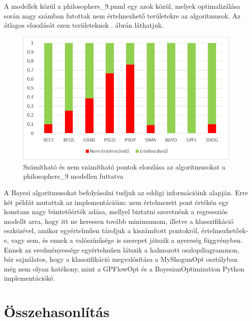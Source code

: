 A modellek közül a philosophers\_9.pnml egy azok közül, melyek optimalizálása során nagy számban futottak nem értelmezhető területekre az algoritmusok. Az átlagos eloszlását ezen területeknek . ábrán láthatjuk.

\begin{figure}[!ht]
	\centering
	\includegraphics[width=140mm, keepaspectratio]{figures/fil9pontaranyok.png}
	\caption{Számítható és nem számítható pontok eloszlása az algoritmusokat a philosophers\_9 modellen futtatva}
	\label{fig:ertelmezhetopontok}
\end{figure}

A Bayesi algoritmusokat befolyásolni tudjuk az eddigi információink alapján. Erre két példát mutattak az implementációim: nem értelmezett pont értékén egy konstans nagy büntetőérték adása, mellyel biztatni szeretnénk a regressziós modellt arra, hogy itt ne keressen tovább minimumom, illetve a klasszifikáció eszközével, amikor egyértelműen tároljuk a kiszámított pontokról, értelmezhetőek-e, vagy sem, és ennek a valószínűsége is szerepet játszik a nyereség függvényben. Ennek az eredményessége egyértelműen látszik a halmozott oszlopdiagrammon, bár sajnálatos, hogy a klasszifikáció megvalósítása a MyShogunOpt osztályban még nem olyan hatékony, mint a GPFlowOpt és a BayesianOptimization Python implementációké.
\section{Összehasonlítás}
